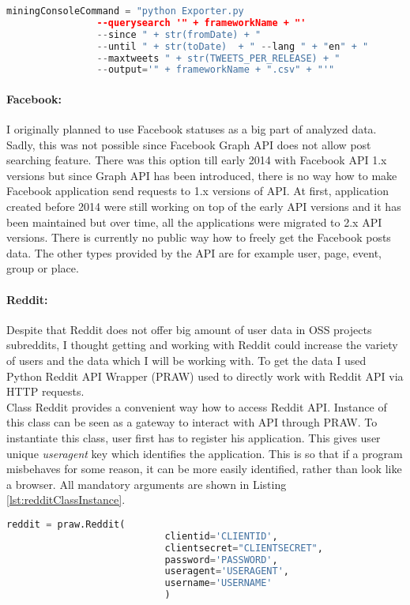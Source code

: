 \begin{lstlisting}[caption={Creating command to get Tweets about a project version in particular time interval around release date},label={lst:beforeAfterReleaseDatesScript},language=Python]
miningConsoleCommand = "python Exporter.py 
				--querysearch '" + frameworkName + "' 
				--since " + str(fromDate) + " 
				--until " + str(toDate)  + " --lang " + "en" + " 
				--maxtweets " + str(TWEETS_PER_RELEASE) + " 
				--output='" + frameworkName + ".csv" + "'"
\end{lstlisting}


\paragraph{Facebook:}
I originally planned to use Facebook statuses as a big part of analyzed data. Sadly, this was not possible since Facebook Graph API does not allow post searching feature. There was this option till early 2014 with Facebook API 1.x versions but since Graph API has been introduced, there is no way how to make Facebook application send requests to 1.x versions of API. At first, application created before 2014 were still working on top of the early API versions and it has been maintained but over time, all the applications were migrated to 2.x API versions. There is currently no public way how to freely get the Facebook posts data. The other types provided by the API are for example user, page, event, group or place.

\paragraph{Reddit:}
Despite that Reddit does not offer big amount of user data in OSS projects subreddits, I thought getting and working with Reddit could increase the variety of users and the data which I will be working with. To get the data I used Python Reddit API Wrapper (PRAW) used to directly work with Reddit API via HTTP requests.\\
Class Reddit provides a convenient way how to access Reddit API. Instance of this class can be seen as a gateway to interact with API through PRAW. To instantiate this class, user first has to register his application. This gives user unique \textit{useragent} key which identifies the application. This is so that if a program misbehaves for some reason, it can be more easily identified, rather than look like a browser. All mandatory arguments are shown in Listing \ref{lst:redditClassInstance}.
\newpage
\begin{lstlisting}[caption={Instantiating Reddit class object},label={lst:redditClassInstance},language=Python]
reddit = praw.Reddit(
							clientid='CLIENTID',
							clientsecret="CLIENTSECRET", 				
							password='PASSWORD',
							useragent='USERAGENT',
							username='USERNAME'
							)
\end{lstlisting}

